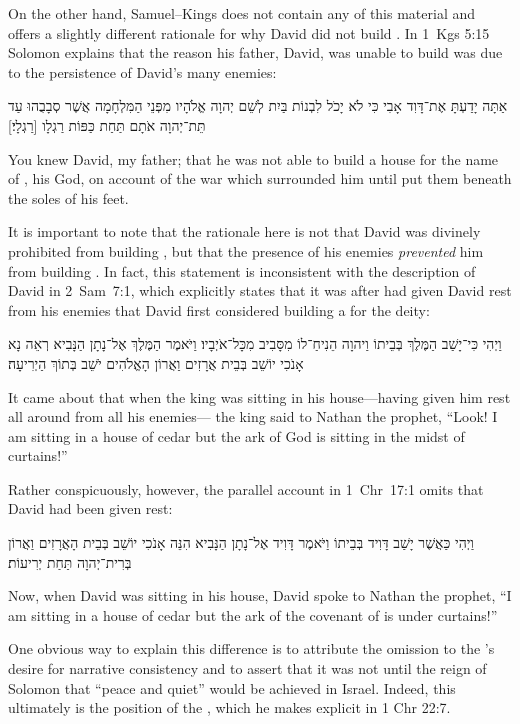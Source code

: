 On the other hand, Samuel--Kings does not contain any of this material and offers a slightly different rationale for why David did not build \thetemple. In 1~Kgs 5:15 Solomon explains that the reason his father, David, was unable to build \thetemple was due to the persistence of David's many enemies:
\begin{hebrewtext}
    אַתָּה יָדַעְתָּ אֶת־דָּוִד אָבִי כִּי לֹא יָכֹל לִבְנוֹת בַּיִת לְשֵׁם יְהוָה אֱלֹהָיו מִפְּנֵי הַמִּלְחָמָה אֲשֶׁר סְבָבֻהוּ עַד תֵּת־יְהוָה אֹתָם תַּחַת כַּפּוֹת רַגְלָו [רַגְלָי׃] 
\end{hebrewtext}
\begin{translation}
    You knew David, my father; that he was not able to build a house for the name of \yahweh, his God, on account of the war which surrounded him until \yahweh put them beneath the soles of his feet.
\end{translation}
\noindent
It is important to note that the rationale here is not that David was divinely prohibited from building \thetemple, but that the presence of his enemies \emph{prevented} him from building \thetemple. In fact, this statement is inconsistent with the description of David in 2~Sam~7:1, which explicitly states that it was after \yahweh had given David rest from his enemies that David first considered building a \temple for the deity:
    \begin{hebrewtext}
        וַיְהִי כִּי־יָשַׁב הַמֶּלֶךְ בְּבֵיתוֹ וַיהוָה הֵנִיחַ־לוֹ מִסָּבִיב מִכָּל־אֹיְבָיו׃
        וַיֹּאמֶר הַמֶּלֶךְ אֶל־נָתָן הַנָּבִיא רְאֵה נָא אָנֹכִי יוֹשֵׁב בְּבֵית אֲרָזִים וַאֲרוֹן הָאֱלֹהִים יֹשֵׁב בְּתוֹךְ הַיְרִיעָה׃
    \end{hebrewtext}
    \begin{translation}
        It came about that when the king was sitting in his house---\yahweh having given him rest all around from all his enemies---
        the king said to Nathan the prophet, ``Look! I am sitting in a house of cedar but the ark of God is sitting in the midst of curtains!''
    \end{translation}
\noindent
Rather conspicuously, however, the parallel account in 1~Chr~17:1 omits that David had been given rest:
\begin{hebrewtext}
    וַיְהִי כַּאֲשֶׁר יָשַׁב דָּוִיד בְּבֵיתוֹ וַיֹּאמֶר דָּוִיד אֶל־נָתָן הַנָּבִיא הִנֵּה אָנֹכִי יוֹשֵׁב בְּבֵית הָאֲרָזִים וַאֲרוֹן בְּרִית־יְהוָה תַּחַת יְרִיעוֹת׃
\end{hebrewtext}
\begin{translation}
    Now, when David was sitting in his house, David spoke to Nathan the prophet, ``I am sitting in a house of cedar but the ark of the covenant of \yahweh is under curtains!'' 
\end{translation}
\noindent
One obvious way to explain this difference is to attribute the omission to the \chronicler's desire for narrative consistency and to assert that it was not until the reign of Solomon that ``peace and quiet'' would be achieved in Israel. Indeed, this ultimately is the position of the \chronicler, which he makes explicit in 1 Chr 22:7. 

